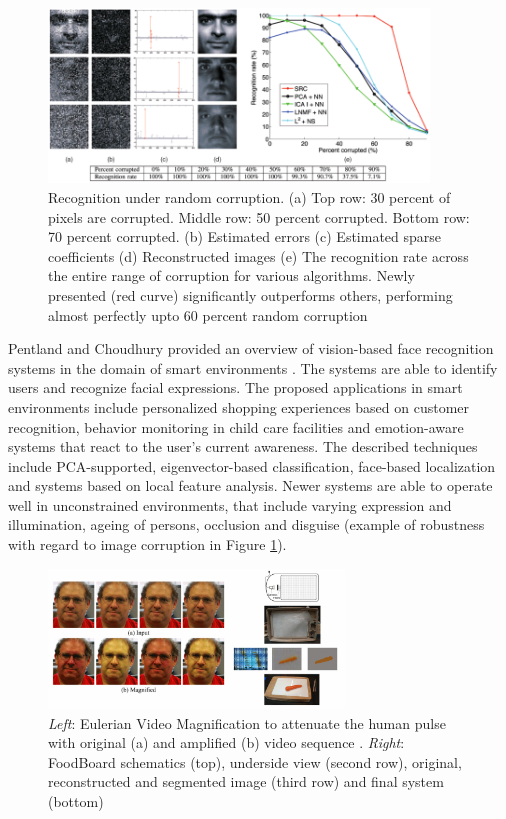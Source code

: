 \begin{figure}[h]
\centering
\includegraphics[width=0.9\textwidth]{images/facerec_noise}
\caption{Recognition under random corruption. (a) Top row: 30 percent of pixels are corrupted. Middle row: 50 percent corrupted. Bottom row: 70 percent corrupted. (b) Estimated errors (c) Estimated sparse coefficients (d) Reconstructed images (e) The recognition rate across the entire range of corruption for various algorithms. Newly presented (red curve) significantly outperforms others, performing almost perfectly upto 60 percent random corruption \cite{wright2009robust}}
\label{fig:facerec_noise}
\end{figure}

Pentland and Choudhury provided an overview of vision-based face recognition systems in the domain of smart environments \cite{pentland2000face}. The systems are able to identify users and recognize facial expressions. The proposed applications in smart environments include personalized shopping experiences based on customer recognition, behavior monitoring in child care facilities and emotion-aware systems that react to the user's current awareness. The described techniques include PCA-supported, eigenvector-based classification, face-based localization and systems based on local feature analysis. Newer systems are able to operate well in unconstrained environments, that include varying expression and illumination, ageing of persons, occlusion and disguise \cite{wright2009robust} (example of robustness with regard to image corruption in Figure \ref{fig:facerec_noise}).
\begin{figure}[h]
\centering
\includegraphics[width=0.7\textwidth]{images/rgb_euler_food}
\caption{\emph{Left}: Eulerian Video Magnification to attenuate the human pulse with original (a) and amplified (b) video sequence  \cite{Wu2012}. \emph{Right}: FoodBoard schematics (top), underside view (second row), original, reconstructed and segmented image (third row) and final system (bottom) \cite{pham2013foodboard}}
\label{fig:rgb_euler_food}
\end{figure}


